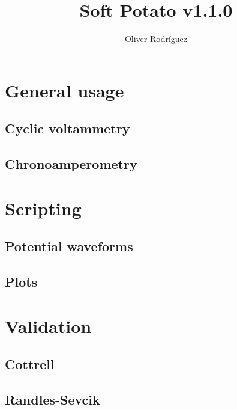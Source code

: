 \documentclass{article}
\title{Soft Potato v1.1.0}
\author{Oliver Rodr\'iguez}
\begin{document}
\maketitle

\section{General usage}
\subsection{Cyclic voltammetry}

\subsection{Chronoamperometry}


\section{Scripting}
\subsection{Potential waveforms}
\subsection{Plots}


\section{Validation}
\subsection{Cottrell}
\subsection{Randles-Sevcik}
\end{document}

